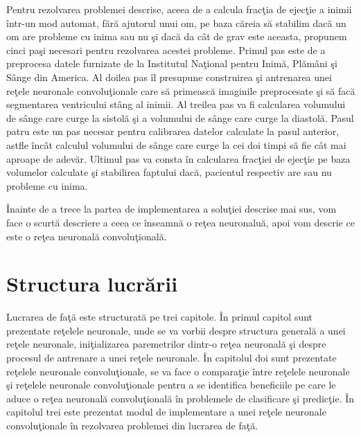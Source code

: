 Pentru rezolvarea problemei descrise, aceea de a calcula frac\c{t}ia de ejec\c{t}ie a inimii \^{i}ntr-un mod automat, f\u{a}r\u{a} ajutorul unui om, pe baza c\u{a}reia s\u{a} stabilim dac\u{a} un om are probleme cu inima sau nu \c{s}i dac\u{a} da c\^{a}t de grav este aceasta, propunem cinci pa\c{s}i necesari pentru rezolvarea acestei probleme. Primul pas este de a preprocesa datele furnizate de la Institutul Na\c{t}ional pentru Inim\u{a}, Pl\u{a}m\^{a}ni \c{s}i S\^{a}nge din America. Al doilea pas \^{i}l presupune construirea \c{s}i antrenarea unei re\c{t}ele neuronale convolu\c{t}ionale care s\u{a} primeasc\u{a} imaginile preprocesate \c{s}i s\u{a} fac\u{a} segmentarea ventricului st\^{a}ng al inimii. Al treilea pas va fi calcularea volumului de s\^{a}nge care curge la sistol\u{a} \c{s}i a volumului de s\^{a}nge care curge la diastol\u{a}. Pasul patru este un pas necesar pentru calibrarea datelor calculate la pasul anterior, astfle \^{i}nc\^{a}t calculul volumului de s\^{a}nge care curge la cei doi timpi s\u{a} fie c\^{a}t mai aproape de adev\u{a}r. Ultimul pas va consta \^{i}n calcularea frac\c{t}iei de ejec\c{t}ie pe baza volumelor calculate \c{s}i stabilirea faptului dac\u{a}, pacientul respectiv are sau nu probleme cu inima. 

\par

\^{I}nainte de a trece la partea de implementarea a solu\c{t}iei descrise mai sus, vom face o scurt\u{a} descriere a ceea ce \^{i}nseamn\u{a} o re\c{t}ea neuronalu\u{a}, apoi vom descrie ce este o re\c{t}ea neuronal\u{a} convolu\c{t}ional\u{a}.

\section{Structura lucr\u{a}rii}

Lucrarea de fa\c{t}\u{a} este structurat\u{a} pe trei capitole. \^{I}n primul capitol sunt prezentate re\c{t}elele neuronale, unde se va vorbii despre structura general\u{a} a unei re\c{t}ele neuronale, ini\c{t}ializarea paremetrilor dintr-o re\c{t}ea neuronal\u{a} \c{s}i despre procesul de antrenare a unei re\c{t}ele neuronale. \^{I}n capitolul doi sunt prezentate re\c{t}elele neuronale convolu\c{t}ionale, se va face o compara\c{t}ie \^{i}ntre re\c{t}elele neuronale \c{s}i re\c{t}elele neuronale convolu\c{t}ionale pentru a se identifica beneficiile pe care le aduce o re\c{t}ea neuronal\u{a} convolu\c{t}ional\u{a} \^{i}n problemele de clasificare \c{s}i predic\c{t}ie. \^{I}n capitolul trei este prezentat modul de implementare a unei re\c{t}ele neuronale convolu\c{t}ionale \^{i}n rezolvarea problemei din lucrarea de fa\c{t}\u{a}.